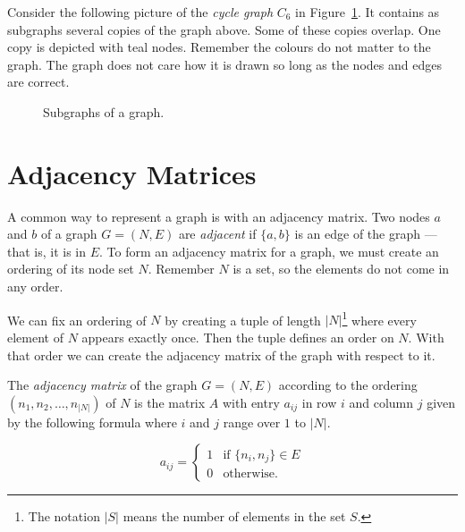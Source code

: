 \documentclass{iansnotes}
\begin{document}
  Consider the following picture of the \emph{cycle graph} $C_6$ in Figure~\ref{figure:subgraphs}.
  It contains as subgraphs several copies of the graph above.
  Some of these copies overlap.
  One copy is depicted with teal nodes.
  Remember the colours do not matter to the graph.
  The graph does not care how it is drawn so long as the nodes and edges are correct.
  \begin{figure}
    \centering
    \caption{Subgraphs of a graph.}
    \label{figure:subgraphs}
  \end{figure}

\section{Adjacency Matrices}
  A common way to represent a graph is with an adjacency matrix.
  Two nodes $a$ and $b$ of a graph $G = (N, E)$ are \emph{adjacent} if $\{a,b\}$ is an edge of the graph --- that is, it is in $E$.
  To form an adjacency matrix for a graph, we must create an ordering of its node set $N$.
  Remember $N$ is a set, so the elements do not come in any order.
  
  We can fix an ordering of $N$ by creating a tuple of length $|N|$\footnote{The notation $|S|$ means the number of elements in the set $S$.} where every element of $N$ appears exactly once.
  Then the tuple defines an order on $N$.
  With that order we can create the adjacency matrix of the graph with respect to it.

  The \emph{adjacency matrix} of the graph $G = (N, E)$ according to the ordering $(n_1, n_2, \ldots, n_{|N|})$ of $N$ is the matrix $A$ with entry $a_{ij}$ in row $i$ and column $j$ given by the following formula where $i$ and $j$ range over $1$ to $|N|$.
  
  \[ a_{ij} = \begin{cases} 1 & \text{if } \{n_i, n_j\} \in E \\ 0 & \text{otherwise.} \end{cases}\]
\end{document}
